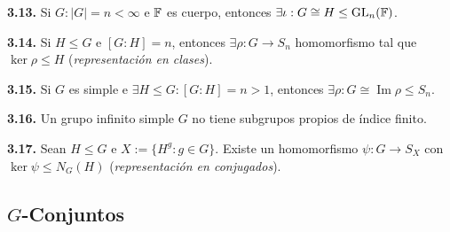 
\begin{corollary}
    \textbf{3.13.} Si \(G : |G | = n < \infty\) e \(\mathbb{F}\) es cuerpo, entonces \(\exists \iota : G \cong H \leq \operatorname{GL}_n(\mathbb{F})\). 
\end{corollary}

\begin{theorem}
    \textbf{3.14.} Si \(H \leq G\) e \([G:H] = n \), entonces \(\exists \rho: G \to S_n\) homomorfismo tal que \(\ker \rho \leq H\) (\emph{representación en clases}).
\end{theorem}


\begin{corollary}
    \textbf{3.15.} Si \(G\) es simple e \(\exists H\leq G : [G:H] = n>1\), entonces \(\exists \rho: G \cong \operatorname{Im} \rho \leq S_n\).   
\end{corollary}

\begin{corollary}
    \textbf{3.16.} Un grupo infinito simple \(G\) no tiene subgrupos propios de índice finito. 
\end{corollary}

\begin{theorem}
    \textbf{3.17.} Sean \(H \leq G\) e \(X := \{H^g : g \in G\}\). Existe un homomorfismo \(\psi:G \to S_X \) con \(\ker\psi \leq N_G(H)\) (\emph{representación en conjugados}).  
\end{theorem}


\subsection*{\(G\)-Conjuntos}

